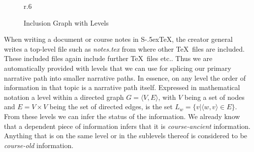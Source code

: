 \documentclass{llncs}
\def\stex{\texorpdfstring{\raisebox{-.5ex}S\kern-.5ex\TeX}{sTeX}\xspace}
\begin{document}
\begin{figure}r{.6\textwidth}\vspace{-2em}
  \vspace{-1em}
  \caption{Inclusion Graph with Levels}\label{fig:levelsGraph}
\vspace{-1em}
\end{figure}
When writing a document or course notes in \stex, the creator general writes a top-level
file such as \textit{notes.tex} from where other \TeX\ files are included. These included
files again include further \TeX\ files etc.. Thus we are automatically provided with
levels that we can use for splicing our primary narrative path into smaller narrative
paths. In essence, on any level the order of information in that topic is a narrative path
itself. Expressed in mathematical notation a level within a directed graph
$G = \langle V, E \rangle $, with $V$ being a set of nodes and $E = V \times V$ being the
set of directed edges, is the set
$L_w = \lbrace v \vert \langle w, v \rangle \in E \rbrace$. From these levels we can infer
the status of the information. We already know that a dependent piece of information
infers that it is \textit{course-ancient} information. Anything that is on the same level
or in the sublevels thereof is considered to be \textit{course-old} information.
\end{document}
